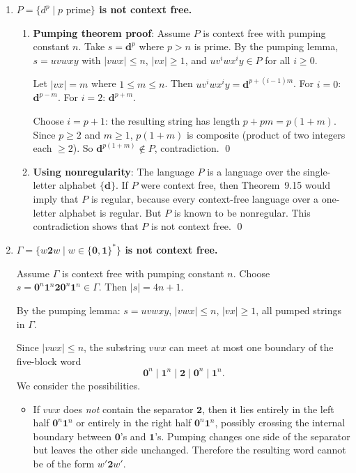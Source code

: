 \begin{enumerate}[{9.}1. ]
\item \textbf{$P = \{d^p \mid p \text{ prime}\}$ is not context free.}

\begin{enumerate}
\item \textbf{Pumping theorem proof}: Assume $P$ is context free with pumping constant $n$. Take $s = \pmb{d}^p$ where $p > n$ is prime. By the pumping lemma, $s = uvwxy$ with $|vwx| \leq n$, $|vx| \geq 1$, and $uv^i wx^i y \in P$ for all $i \geq 0$.

Let $|vx| = m$ where $1 \leq m \leq n$. Then $uv^i wx^i y = \pmb{d}^{p + (i-1)m}$. For $i=0$: $\pmb{d}^{p-m}$. For $i=2$: $\pmb{d}^{p+m}$.

Choose $i = p+1$: the resulting string has length $p + pm = p(1+m)$. Since $p \geq 2$ and $m \geq 1$, $p(1+m)$ is composite (product of two integers each $\geq 2$). So $\pmb{d}^{p(1+m)} \notin P$, contradiction. \qed

\item \textbf{Using nonregularity}: The language $P$ is a language over the
single-letter alphabet $\{\pmb{d}\}$.  If $P$ were context free, then
Theorem~9.15 would imply that $P$ is regular, because every context-free
language over a one-letter alphabet is regular.  But $P$ is known to be
nonregular.  This contradiction shows that $P$ is not context free. \qed
\end{enumerate}

\item \textbf{$\Gamma = \{w\pmb{2}w \mid w \in \{\pmb{0},\pmb{1}\}^*\}$ is not context free.}

Assume $\Gamma$ is context free with pumping constant $n$. Choose $s = \pmb{0}^n\pmb{1}^n\pmb{2}\pmb{0}^n\pmb{1}^n \in \Gamma$.  Then $|s|=4n+1$.

By the pumping lemma: $s = uvwxy$, $|vwx| \leq n$, $|vx| \geq 1$, all pumped strings in $\Gamma$.

Since $|vwx|\leq n$, the substring $vwx$ can meet at most one boundary of the
five-block word
\[
\pmb{0}^n\mid \pmb{1}^n\mid \pmb{2}\mid \pmb{0}^n\mid \pmb{1}^n.
\]
We consider the possibilities.

\begin{itemize}
\item If $vwx$ does \emph{not} contain the separator $\pmb{2}$, then it lies
entirely in the left half $\pmb{0}^n\pmb{1}^n$ or entirely in the right half
$\pmb{0}^n\pmb{1}^n$, possibly crossing the internal boundary between
$\pmb{0}$'s and $\pmb{1}$'s.  Pumping changes one side of the separator but
leaves the other side unchanged.  Therefore the resulting word cannot be of the
form $w'\pmb{2}w'$.


\end{itemize}
\end{enumerate}
